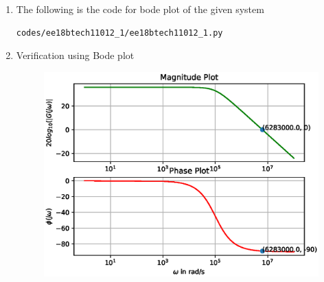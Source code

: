 \begin{enumerate}[label=\thesubsection.\arabic*.,ref=\thesubsection.\theenumi]
\item The following is the code for bode plot of the given system
\begin{lstlisting}
codes/ee18btech11012_1/ee18btech11012_1.py
\end{lstlisting}
\item Verification using Bode plot
\begin{figure}[!ht]
\centering
\includegraphics[width=\columnwidth]{./figs/ee18btech11012_1/ee18btech11012_1.eps}
\caption{}
\label{fig:ee18btech11012_1}
\end{figure}
\end{enumerate}
